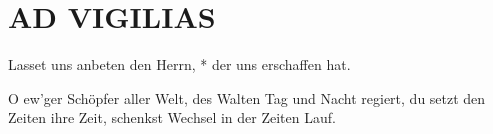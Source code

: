 \thispagestyle{plain}



\section[VIGILIAE]{AD VIGILIAS}


\vspace{0.2cm}

\def\greinitialformat#1{{\fontsize{50}{50}\selectfont #1}}
\setaboveinitialseparation{0.72mm}


\medskip

\begin{sloppypar}
{\noindent\rm{Lasset uns anbeten den Herrn, * der uns erschaffen hat.}}
\end{sloppypar}

\vspace{0.3cm}


\def\greinitialformat#1{{\fontsize{40}{40}\selectfont #1}}
\gresetfirstlineaboveinitial{\small \textcolor{red}{hieme}}{}
\setaboveinitialseparation{0.72mm}

\medskip


\begin{sloppypar}
{\noindent\rm{ O ew'ger Schöpfer aller Welt,
des Walten Tag und Nacht regiert, du setzt den Zeiten ihre Zeit,
schenkst Wechsel in der Zeiten Lauf.}}
\end{sloppypar}

